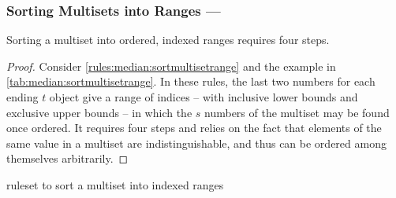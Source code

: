 \subsubsection{Sorting Multisets into Ranges --- }\label{sec:median:sortmultisetrange}

\begin{proposition}\label{prop:median:sortmultisetrange}
Sorting a multiset into ordered, indexed ranges requires four steps.
\end{proposition}

\begin{proof}
Consider \cref{rules:median:sortmultisetrange} and the example in \cref{tab:median:sortmultisetrange}.  In these rules, the last two numbers for each ending \(t\) object give a range of indices -- with inclusive lower bounds and exclusive upper bounds -- in which the \(s\) numbers of the multiset may be found once ordered.  It requires four steps and relies on the fact that elements of the same value in a multiset are indistinguishable, and thus can be ordered among themselves arbitrarily.

\end{proof}

\begin{cprulesetfloat}
\begin{cpruleset}




\end{cpruleset}
\caption{\label{rules:median:sortmultisetrange}\Gls{ruleset} to sort a multiset into indexed ranges}
\end{cprulesetfloat}

